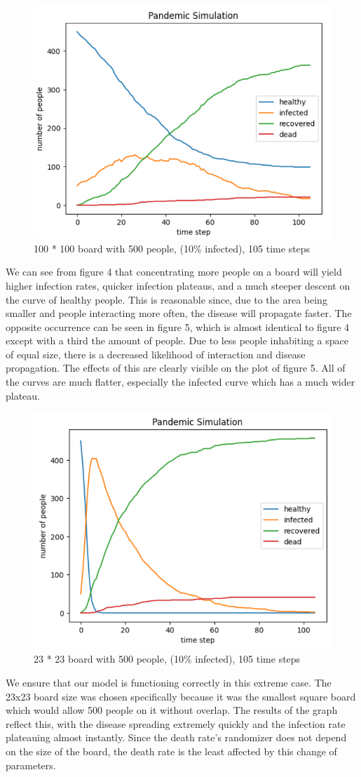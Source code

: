 \documentclass{article}
\begin{document}
\begin{figure}[H]
    \centering
    \includegraphics[width=.6\linewidth]{situation5.PNG}
    \caption{100 * 100 board with 500 people, (10\% infected), 105 time steps}
    \label{fig:enter-label}
\end{figure} 
We can see from figure 4 that concentrating more people on a board will yield higher infection rates, quicker infection plateaus, and a much steeper descent on the curve of healthy people. This is reasonable since, due to the area being smaller and people interacting more often, the disease will propagate faster. The opposite occurrence can be seen in figure 5, which is almost identical to figure 4 except with a third the amount of people. Due to less people inhabiting a space of equal size, there is a decreased likelihood of interaction and disease propagation. The effects of this are clearly visible on the plot of figure 5. All of the curves are much flatter, especially the infected curve which has a much wider plateau. \\
\begin{figure}[H]
    \centering
    \includegraphics[width=.6\linewidth]{situation6.PNG}
    \caption{23 * 23 board with 500 people, (10\% infected), 105 time steps}
    \label{fig:enter-label}
\end{figure}
We ensure that our model is functioning correctly in this extreme case. The 23x23 board size was chosen specifically because it was the smallest square board which would allow 500 people on it without overlap. The results of the graph reflect this, with the disease spreading extremely quickly and the infection rate plateauing almost instantly. Since the death rate's randomizer does not depend on the size of the board, the death rate is the least affected by this change of parameters. \\\\
\end{document}
